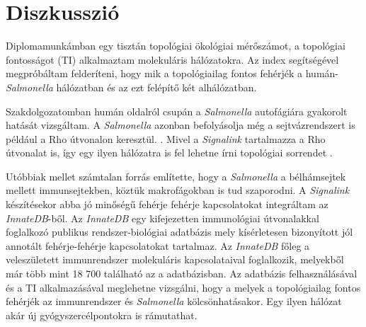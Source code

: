 \documentclass[a4paper,12pt]{article}
\begin{document}
		\pagebreak
	
\section{Diszkusszió}
		Diplomamunkámban egy tisztán topológiai ökológiai mérőszámot, a topológiai fontosságot (TI) alkalmaztam molekuláris hálózatokra. Az index segítségével megpróbáltam felderíteni, hogy mik a topológiailag fontos fehérjék a humán-\textit{Salmonella} hálózatban és az ezt felépítő két alhálózatban. 
		
		Szakdolgozatomban humán oldalról csupán a \textit{Salmonella} autofágiára gyakorolt hatását vizsgáltam. A \textit{Salmonella} azonban befolyásolja még a sejtvázrendszert is például a Rho útvonalon keresztül. \cite{salmonella_and_host_cell_nature} \cite{salmonella_autophagy_nature_old}. Mivel a \textit{Signalink} tartalmazza a Rho útvonalat is, így egy ilyen hálózatra is fel lehetne írni topológiai sorrendet .
		
		Utóbbiak mellet számtalan forrás \cite{salmonella_and_host_cell_nature} \cite{salmonella_autophagy_nature_old} \cite{hilD} említette, hogy a \textit{Salmonella} a bélhámsejtek mellett immunsejtekben, köztük makrofágokban is tud szaporodni. A \textit{Signalink} készítésekor abba jó minőségű fehérje fehérje kapcsolatokat integráltam az \textit{InnateDB}-ből. Az \textit{InnateDB} egy kifejezetten immunológiai útvonalakkal foglalkozó publikus rendszer-biológiai adatbázis mely kísérletesen bizonyított jól annotált fehérje-fehérje kapcsolatokat tartalmaz. Az \textit{InnateDB} főleg a veleszületett immunrendszer molekuláris kapcsolataival foglalkozik, melyekből már több mint 18 700 található az a adatbázisban. \cite{innatedb} Az adatbázis felhasználásával és a TI alkalmazásával meglehetne vizsgálni, hogy a melyek a topológiailag fontos fehérjék az immunrendszer és \textit{Salmonella} kölcsönhatásakor. Egy ilyen hálózat akár új gyógyszercélpontokra is rámutathat.
		
\end{document}
